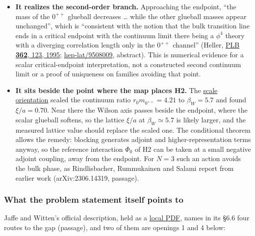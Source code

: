 \documentclass[11pt,a4paper]{article}
\newcommand{\tightlist}{\setlength{\itemsep}{0pt}\setlength{\parskip}{0pt}}
\begin{document}
\begin{itemize}
\tightlist
\item
  \textbf{It realizes the second-order branch.} Approaching the
  endpoint, ``the mass of the \(0^{++}\) glueball decreases \ldots{}
  while the other glueball masses appear unchanged'', which is
  ``consistent with the notion that the bulk transition line ends in a
  critical endpoint with the continuum limit there being a \(\phi^4\)
  theory with a diverging correlation length only in the \(0^{++}\)
  channel'' (Heller,
  \href{https://doi.org/10.1016/0370-2693(95)01186-T}{PLB \textbf{362},
  123, 1995};
  \href{https://arxiv.org/abs/hep-lat/9508009}{hep-lat/9508009},
  abstract). This is numerical evidence for a scalar critical-endpoint
  interpretation, not a constructed second continuum limit or a proof of
  uniqueness on families avoiding that point.
\item
  \textbf{It sits beside the point where the map places H2.} The
  \href{mass-gap-conditional-theorem.md\#numerical-orientation-and-its-limits}{scale
  orientation} scaled the continuum ratio \(r_0m_{0^{++}}=4.21\) to
  \(\beta_W=5.7\) and found \(\xi/a=0.70\). Near there the Wilson axis
  passes beside the endpoint, where the scalar glueball softens, so the
  lattice \(\xi/a\) at \(\beta_W\simeq5.7\) is likely larger, and the
  measured lattice value should replace the scaled one. The conditional
  theorem allows the remedy: blocking generates adjoint and
  higher-representation terms anyway, so the reference interaction
  \(\Phi_0\) of H2 can be taken at a small negative adjoint coupling,
  away from the endpoint. For \(N=3\) such an action avoids the bulk
  phase, as Rindlisbacher, Rummukainen and Salami report from earlier
  work (arXiv:2306.14319, passage).
\end{itemize}

\hypertarget{what-the-problem-statement-itself-points-to}{%
\subsubsection{What the problem statement itself points
to}\label{what-the-problem-statement-itself-points-to}}

Jaffe and Witten's official description, held as a
\href{../docs/JaffeWitten_YangMills.pdf}{local PDF}, names in its §6.6
four routes to the gap (passage), and two of them are openings 1 and 4
below:
\end{document}

